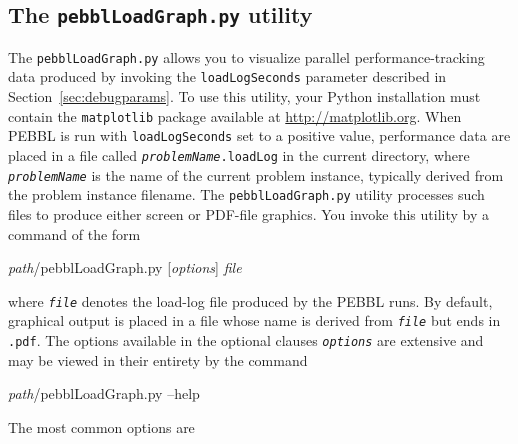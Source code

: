 \subsection{The \texttt{pebblLoadGraph.py} utility}
\label{sec:pebblLoadGraph}
The \texttt{pebblLoadGraph.py} allows you to visualize parallel
performance-tracking data produced by invoking the
\texttt{loadLogSeconds} parameter described in
Section~\ref{sec:debugparams}.  To use this utility, your Python
installation must contain the \texttt{matplotlib} package available at
\url{http://matplotlib.org}.  When PEBBL is run with
\texttt{loadLogSeconds} set to a positive value, performance data are
placed in a file called \texttt{\textit{problemName}.loadLog} in the
current directory, where \texttt{\textit{problemName}} is the name of
the current problem instance, typically derived from the problem
instance filename.  The \texttt{pebblLoadGraph.py} utility processes such
files to produce either screen or PDF-file graphics.  You invoke this
utility by a command of the form
\begin{codeblock}
\textit{path}/pebblLoadGraph.py \textrm{[}\textit{options}\textrm{]} 
\textit{file}
\end{codeblock}
where \texttt{\textit{file}} denotes the load-log file produced by the
PEBBL runs.  By default, graphical output is placed in a file whose
name is derived from \texttt{\textit{file}} but ends in \texttt{.pdf}.
The options available in the optional clauses
\texttt{\textit{options}} are extensive and may be viewed in their
entirety by the command
\begin{codeblock}
\textit{path}/pebblLoadGraph.py --help
\end{codeblock}
The most common options are
